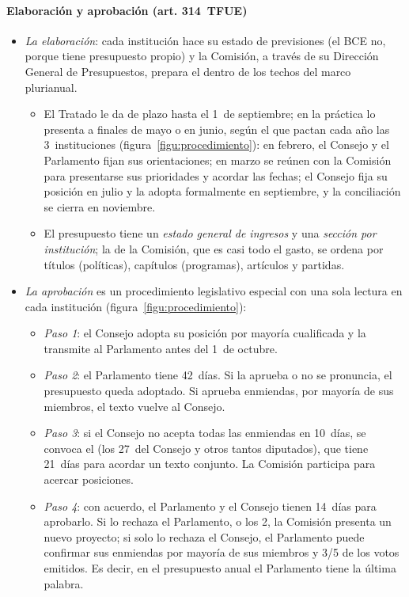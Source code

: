 \documentclass[11pt]{article}
\begin{document}
\paragraph{Elaboración y aprobación (art. 314~TFUE)}

\begin{itemize}
\item \emph{La elaboración}: cada institución hace su estado de previsiones (el BCE no, porque tiene presupuesto propio) y la Comisión, a través de su Dirección General de Presupuestos, prepara el  dentro de los techos del marco plurianual.
  \begin{itemize}
  \item El Tratado le da de plazo hasta el 1~de septiembre; en la práctica lo presenta a finales de mayo o en junio, según el  que pactan cada año las 3~instituciones (figura~\ref{figu:procedimiento}): en febrero, el Consejo y el Parlamento fijan sus orientaciones; en marzo se reúnen con la Comisión para presentarse sus prioridades y acordar las fechas; el Consejo fija su posición en julio y la adopta formalmente en septiembre, y la conciliación se cierra en noviembre\nocite{Consejo2022CalendarioPragmatico}.
  \item El presupuesto tiene un \emph{estado general de ingresos} y una \emph{sección por institución}; la de la Comisión, que es casi todo el gasto, se ordena por títulos (políticas), capítulos (programas), artículos y partidas.
  \end{itemize}
\item \emph{La aprobación} es un procedimiento legislativo especial con una sola lectura en cada institución (figura~\ref{figu:procedimiento}):
  \begin{itemize}
  \item \emph{Paso 1}: el Consejo adopta su posición por mayoría cualificada y la transmite al Parlamento antes del 1~de octubre.
  \item \emph{Paso 2}: el Parlamento tiene 42~días. Si la aprueba o no se pronuncia, el presupuesto queda adoptado. Si aprueba enmiendas, por mayoría de sus miembros, el texto vuelve al Consejo.
  \item \emph{Paso 3}: si el Consejo no acepta todas las enmiendas en 10~días, se convoca el  (los 27~del Consejo y otros tantos diputados), que tiene 21~días para acordar un texto conjunto. La Comisión participa para acercar posiciones.
  \item \emph{Paso 4}: con acuerdo, el Parlamento y el Consejo tienen 14~días para aprobarlo. Si lo rechaza el Parlamento, o los 2, la Comisión presenta un nuevo proyecto; si solo lo rechaza el Consejo, el Parlamento puede confirmar sus enmiendas por mayoría de sus miembros y 3/5 de los votos emitidos. Es decir, en el presupuesto anual el Parlamento tiene la última palabra.

\end{itemize}
\end{itemize}
\end{document}
